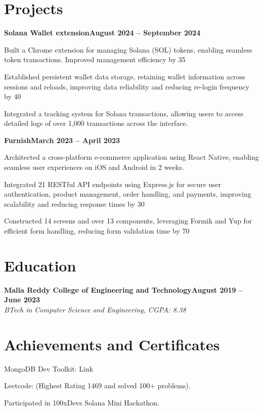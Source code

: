 \documentclass[letterpaper,10pt]{article}
\newcommand{\heading}[2]{
  \hspace{10pt}#1\hfill#2\\
}
\newcommand{\headingBf}[2]{
  \heading{\textbf{#1}}{\textbf{#2}}
}
\newcommand{\headingIt}[2]{
  \heading{\textit{#1}}{\textit{#2}}
}
\newenvironment{resume_list}{
  \vspace{-7pt}
  \begin{itemize}[itemsep=-2px, parsep=1pt, leftmargin=30pt]
}{
  \end{itemize}
}
\begin{document}
  \section{Projects}
  \headingBf{Solana Wallet extension}{August 2024 – September 2024}
  \begin{resume_list}
    \item Built a Chrome extension for managing Solana (SOL) tokens, enabling seamless token transactions. Improved management efficiency by 35
    \item Established persistent wallet data storage, retaining wallet information across sessions and reloads, improving data reliability and reducing re-login frequency by 40
    \item Integrated a tracking system for Solana transactions, allowing users to access detailed logs of over 1,000 transactions across the interface.
  \end{resume_list}
  \headingBf{Furnish}{March 2023 – April 2023}
  \begin{resume_list}
    \item Architected a cross-platform e-commerce application using React Native, enabling seamless user experiences on iOS and Android in 2 weeks.
    \item Integrated 21 RESTful API endpoints using Express.js for secure user authentication, product management, order handling, and payments, improving scalability and reducing response times by 30
    \item Constructed 14 screens and over 13 components, leveraging Formik and Yup for efficient form handling, reducing form validation time by 70
  \end{resume_list}
  \section{Education}
  \headingBf{Malla Reddy College of Engineering and Technology}{August 2019 – June 2023}
  \headingIt{BTech in Computer Science and Engineering, CGPA: 8.38}{}
  \section{Achievements and Certificates}{}
  \begin{resume_list}
    \item MongoDB Dev Toolkit: Link
    \item Leetcode: (Highest Rating 1469 and solved 100+ problems).
    \item Participated in 100xDevs Solana Mini Hackathon.
  \end{resume_list}
\end{document}
